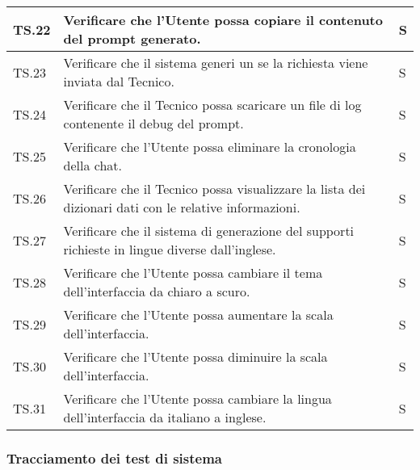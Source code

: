 \begin{adjustwidth}{-0.5cm}{-0.5cm}
\begin{longtable}{|P{1.5cm}|>{\raggedright}P{9.5cm}|>{\arraybackslash}P{1.5cm}|}
		\hline TS.22 & Verificare che l'Utente possa copiare il contenuto del prompt generato. & S \\ 
		\hline TS.23 & Verificare che il sistema generi un  se la richiesta viene inviata dal Tecnico. & S \\ 
		\hline TS.24 & Verificare che il Tecnico possa scaricare un file di log contenente il debug del prompt. & S \\
		\hline TS.25 & Verificare che l'Utente possa eliminare la cronologia della chat. & S \\  
		\hline TS.26 & Verificare che il Tecnico possa visualizzare la lista dei dizionari dati con le relative informazioni. & S \\  
		\hline TS.27 & Verificare che il sistema di generazione del  supporti richieste in lingue diverse dall'inglese. & S \\  
		\hline TS.28 & Verificare che l'Utente possa cambiare il tema dell'interfaccia da chiaro a scuro. & S \\
		\hline TS.29 & Verificare che l'Utente possa aumentare la scala dell'interfaccia. & S \\  
		\hline TS.30 & Verificare che l'Utente possa diminuire la scala dell'interfaccia. & S \\   
		\hline TS.31 & Verificare che l'Utente possa cambiare la lingua dell'interfaccia da italiano a inglese. & S \\   
	\end{longtable}
\end{adjustwidth}
\egroup

\clearpage
\subsubsection{Tracciamento dei test di sistema}

